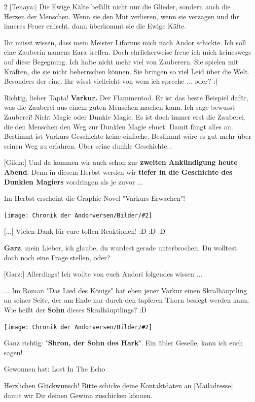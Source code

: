 \documentclass[10pt, a4paper, oneside]{book}
\newcommand{\bildmitts}[2][height=0.32\textwidth,width=0.48\textwidth,keepaspectratio]{%
    \begin{center}
        \texttt{[image: Chronik der Andorversen/Bilder/\#2]}
    \end{center}
}
\begin{document}
\begin{multicols}{2}
[Tenaya:] Die Ewige Kälte befällt nicht nur die Glieder, sondern auch die Herzen der Menschen. Wenn sie den Mut verlieren, wenn sie verzagen und ihr inneres Feuer erlischt, dann überkommt sie die Ewige Kälte.

Ihr müsst wissen, dass mein Meister Lifornus mich nach Andor schickte. Ich soll eine Zauberin namens Eara treffen. Doch ehrlicherweise freue ich mich keineswegs auf diese Begegnung. Ich halte nicht mehr viel von Zauberern. Sie spielen mit Kräften, die sie nicht beherrschen können. Sie bringen so viel Leid über die Welt. Besonders der eine. Ihr wisst vielleicht von wem ich spreche ... oder? :(

Richtig, lieber Tapta! \textbf{Varkur.} Der Flammentod. Er ist das beste Beispiel dafür, was die Zauberei aus einem guten Menschen machen kann. Ich sage bewusst Zauberei! Nicht Magie oder Dunkle Magie. Es ist doch immer erst die Zauberei, die den Menschen den Weg zur Dunklen Magie ebnet. Damit fängt alles an. Bestimmt ist Varkurs Geschichte keine einfache. Bestimmt wäre es gut mehr über seinen Weg zu erfahren. Über seine dunkle Geschichte...

[Gilda:] Und da kommen wir auch schon zur \textbf{zweiten Ankündigung heute Abend}. Denn in diesem Herbst werden wir \textbf{tiefer in die Geschichte des Dunklen Magiers} vordringen als je zuvor ...

Im Herbst erscheint die Graphic Novel "Varkurs Erwachen"!

\bildmitts{AA2022 Tavernen-Party 7.jpeg}

[...] Vielen Dank für eure tollen Reaktionen! :D :D :D

\textbf{Garz}, mein Lieber, ich glaube, du wurdest gerade unterbrochen. Du wolltest doch noch eine Frage stellen, oder?

[Garz:] Allerdings! Ich wollte von euch Andori folgendes wissen ...

... Im Roman "Das Lied des Königs" hat eben jener Varkur einen Skralhäuptling an seiner Seite, der am Ende nur durch den tapferen Thorn besiegt werden kann. Wie heißt der \textbf{Sohn} dieses Skralhäuptlings? :D

\bildmitts{AA2022 Tavernen-Party 8.jpeg}

Ganz richtig: "\textbf{Shron, der Sohn des Hark}". Ein übler Geselle, kann ich euch sagen!

Gewonnen hat: Lost In The Echo

Herzlichen Glückwunsch! Bitte schicke deine Kontaktdaten an [Mailadresse] damit wir Dir deinen Gewinn zuschicken können.


\end{multicols}
\end{document}
